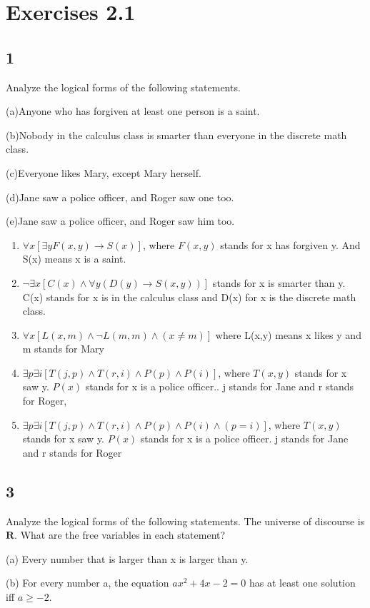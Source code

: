 \documentclass{article}
\begin{document}
\section{Exercises 2.1}
\subsection{1}
Analyze the logical forms of the following statements.

(a)Anyone who has forgiven at least one person is a saint.

(b)Nobody in the calculus class is smarter than everyone in the discrete math class.

(c)Everyone likes Mary, except Mary herself.

(d)Jane saw a police officer, and Roger saw one too.

(e)Jane saw a police officer, and Roger saw him too.
\begin{enumerate}[label=(\alph*)]
    \item 
$\forall x [\exists y F(x,y) \rightarrow S(x)]$, where $F(x,y)$ stands for x has forgiven y. And S(x) means x is a saint.
    \item
$\neg \exists x  [C(x) \land \forall y (D(y) \rightarrow S(x,y))]$ stands for x is smarter than y. C(x) stands for x is in the calculus class and D(x) for x is the discrete math class.
    \item
$\forall x[L(x,m) \land \neg L(m,m)\land (x \neq m)]$ where L(x,y) means x likes y and m stands for Mary
    \item
$\exists p \exists i [T(j,p) \land  T(r,i) \land P(p) \land P(i)]$, where $T(x,y)$ stands for x saw y. $P(x)$ stands for x is a police officer.. j stands for Jane and r stands for Roger,
    \item
$\exists p \exists i [T(j,p) \land T(r,i)\land P(p) \land P(i) \land (p=i)]$, where $T(x,y)$ stands for x saw y. $P(x)$ stands for x is a police officer.  j stands for Jane and r stands for Roger
\end{enumerate}
\subsection{3}
Analyze the logical forms of the following statements. The universe
of discourse is $\mathbf{R}$. What are the free variables in each statement?

(a) Every number that is larger than x is larger than y.

(b) For every number a, the equation $ax^2 + 4x - 2 = 0$ has at least one
solution iff $a \geq -2$.
\end{document}
